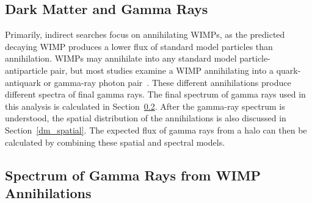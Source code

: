   \subsection{Dark Matter and Gamma Rays}
    Primarily, indirect searches focus on annihilating WIMPs, as the predicted decaying WIMP produces a lower flux of standard model particles than annihilation.
    WIMPs may annihilate into any standard model particle-antiparticle pair, but most studies examine a WIMP annihilating into a quark-antiquark or gamma-ray photon pair~\cite{pdg2016}.
    These different annihilations produce different spectra of final gamma rays.
    The final spectrum of gamma rays used in this analysis is calculated in Section~\ref{dm_spectral}.
    After the gamma-ray spectrum is understood, the spatial distribution of the annihilations is also discussed in Section~\ref{dm_spatial}.
    The expected flux of gamma rays from a halo can then be calculated by combining these spatial and spectral models.
  
  \subsection{Spectrum of Gamma Rays from WIMP Annihilations}\label{dm_spectral}
    
    
    
